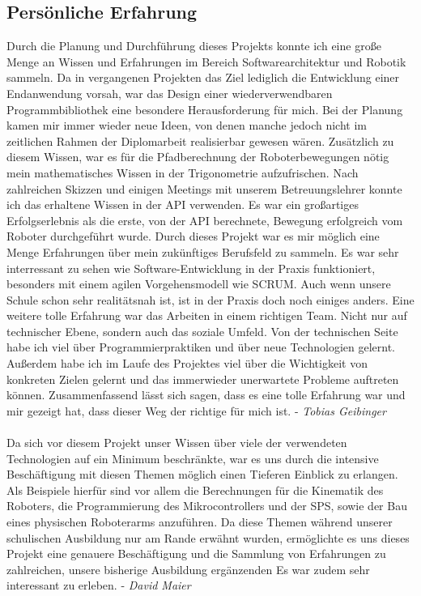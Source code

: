 \subsection{Persönliche Erfahrung}
\par
\begingroup
\leftskip=1cm 
\rightskip=1cm 
\noindent
Durch die Planung und Durchführung dieses Projekts konnte ich eine große Menge an Wissen und Erfahrungen im Bereich Softwarearchitektur und Robotik sammeln. Da in vergangenen Projekten das Ziel lediglich die Entwicklung einer Endanwendung vorsah, war das Design einer wiederverwendbaren Programmbibliothek eine besondere Herausforderung für mich. Bei der Planung kamen mir immer wieder neue Ideen, von denen manche jedoch nicht im zeitlichen Rahmen der Diplomarbeit realisierbar gewesen wären.
Zusätzlich zu diesem Wissen, war es für die Pfadberechnung der Roboterbewegungen nötig mein mathematisches Wissen in der Trigonometrie aufzufrischen. Nach zahlreichen Skizzen und einigen Meetings mit unserem Betreuungslehrer konnte ich das erhaltene Wissen in der API verwenden. Es war ein großartiges Erfolgserlebnis als die erste, von der API berechnete, Bewegung erfolgreich vom Roboter durchgeführt wurde.
Durch dieses Projekt war es mir möglich eine Menge Erfahrungen über mein zukünftiges Berufsfeld zu sammeln. Es war sehr interressant zu sehen wie Software-Entwicklung in der Praxis funktioniert, besonders mit einem agilen Vorgehensmodell wie SCRUM. Auch wenn unsere Schule schon sehr realitätsnah ist, ist in der Praxis doch noch einiges anders. Eine weitere tolle Erfahrung war das Arbeiten in einem richtigen Team. Nicht nur auf technischer Ebene, sondern auch das soziale Umfeld. Von der technischen Seite habe ich viel über Programmierpraktiken und über neue Technologien gelernt.  Außerdem habe ich im Laufe des Projektes viel über die Wichtigkeit von konkreten Zielen gelernt und das immerwieder unerwartete Probleme auftreten können. Zusammenfassend lässt sich sagen, dass es eine tolle Erfahrung war und mir gezeigt hat, dass dieser Weg der richtige für mich ist. - \textit{Tobias Geibinger}
\\\\
Da sich vor diesem Projekt unser Wissen über viele der verwendeten Technologien auf ein Minimum beschränkte, war es uns durch die intensive Beschäftigung mit diesen Themen möglich einen Tieferen Einblick zu erlangen. Als Beispiele hierfür sind vor allem die Berechnungen für die Kinematik des Roboters, die Programmierung des Mikrocontrollers und der SPS, sowie der Bau eines physischen Roboterarms anzuführen. Da diese Themen während unserer schulischen Ausbildung nur am Rande erwähnt wurden, ermöglichte es uns dieses Projekt eine genauere Beschäftigung und die Sammlung von Erfahrungen zu zahlreichen, unsere bisherige Ausbildung ergänzenden 
Es war zudem sehr interessant zu erleben. - \textit{David Maier}
\par
\endgroup
